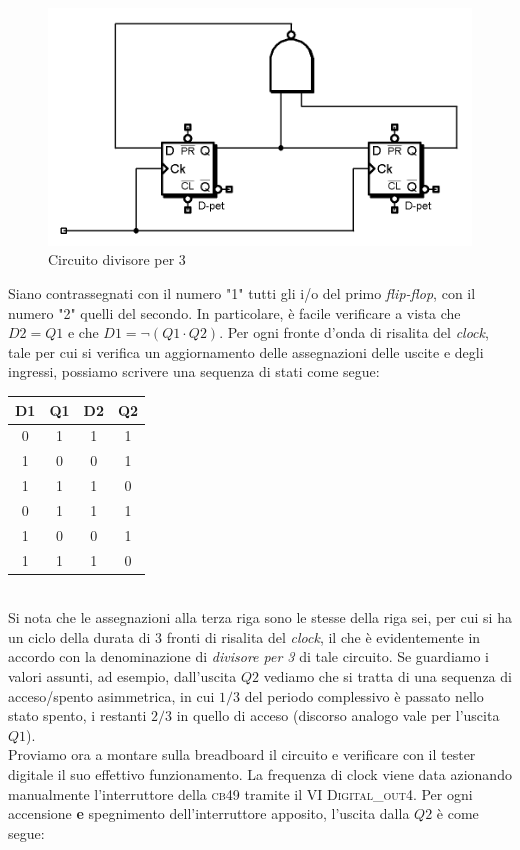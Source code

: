 \documentclass[journal, a4paper]{IEEEtran}
\begin{document}
\begin{figure}
\centering
\includegraphics[width=0.8\linewidth]{./es9_mono}
\caption{Circuito divisore per 3}
\label{fig:es9}
\end{figure}

Siano contrassegnati con il numero "1" tutti gli i/o del primo \textit{flip-flop}, con il numero "2" quelli del secondo. In particolare, è facile verificare a vista che $D2 = Q1$ e che $D1 = \lnot(Q1 \cdot Q2)$. Per ogni fronte d'onda di risalita del \textit{clock}, tale per cui si verifica un aggiornamento delle assegnazioni delle uscite e degli ingressi, possiamo scrivere una sequenza di stati come segue:\\

\begin{table}[h]
\centering
\begin{tabular}{c|c||c|c}
\hline \textbf{D1} & \textbf{Q1} & \textbf{D2} & \textbf{Q2} \\ 
\hline 0 & 1 & 1 & 1 \\ 
 1 & 0 & 0 & 1 \\
 1 & 1 & 1 & 0 \\ 
 0 & 1 & 1 & 1 \\ 
 1 & 0 & 0 & 1 \\
 1 & 1 & 1 & 0 \\
 
\hline
 
\end{tabular} 
\end{table}
~\\

Si nota che le assegnazioni alla terza riga sono le stesse della riga sei, per cui si ha un ciclo della durata di 3 fronti di risalita del \textit{clock}, il che è evidentemente in accordo con la denominazione di \textit{divisore per 3} di tale circuito. Se guardiamo i valori assunti, ad esempio, dall'uscita $Q2$ vediamo che si tratta di una sequenza di acceso/spento asimmetrica, in cui $1/3$ del periodo complessivo è passato nello stato spento, i restanti $2/3$ in quello di acceso (discorso analogo vale per l'uscita $Q1$).\\
Proviamo ora a montare sulla breadboard il circuito e verificare con il tester digitale il suo effettivo funzionamento. La frequenza di clock viene data azionando manualmente l'interruttore della \textsc{cb49} tramite il VI \textsc{Digital\_out4}. Per ogni accensione \textbf{e} spegnimento dell'interruttore apposito, l'uscita dalla $Q2$ è come segue:
\end{document}
